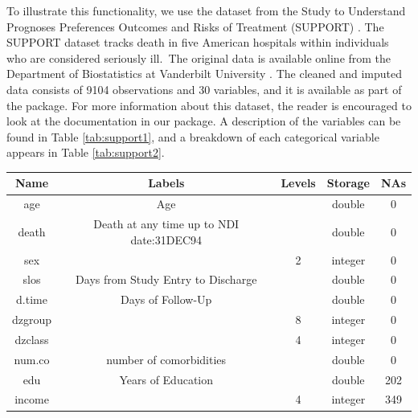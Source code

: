 \documentclass[
]{jss}
\begin{document}
To illustrate this functionality, we use the dataset from the Study to
Understand Prognoses Preferences Outcomes and Risks of Treatment
(SUPPORT) \citep{knaus1995support}. The SUPPORT dataset tracks death in
five American hospitals within individuals who are considered seriously
ill.~The original data is available online from the Department of
Biostatistics at Vanderbilt University \citep{harrell_2020}. The cleaned
and imputed data consists of 9104 observations and 30 variables, and it
is available as part of the  package. For more information
about this dataset, the reader is encouraged to look at the
documentation in our package. A description of the variables can be
found in Table \ref{tab:support1}, and a breakdown of each categorical
variable appears in Table \ref{tab:support2}.

\begin{table}[ht]
\centering
\begin{tabular}{ccccc}
\hline
\textbf{Name} & \textbf{Labels}                          & \textbf{Levels} & \textbf{Storage} & \textbf{NAs} \\
\hline
age           & Age                                      &                 & double           & 0            \\
death         & Death at any time up to NDI date:31DEC94 &                 & double           & 0            \\
sex           &                                          & 2               & integer          & 0            \\
slos          & Days from Study Entry to Discharge       &                 & double           & 0            \\
d.time        & Days of Follow-Up                        &                 & double           & 0            \\
dzgroup       &                                          & 8               & integer          & 0            \\
dzclass       &                                          & 4               & integer          & 0            \\
num.co        & number of comorbidities                  &                 & double           & 0            \\
edu           & Years of Education                       &                 & double           & 202          \\
income        &                                          & 4               & integer          & 349          \\

\end{tabular}
\end{table}
\end{document}
